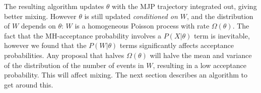 The resulting algorithm updates $\theta$ with the MJP trajectory 
integrated out, giving better mixing.
However $\theta$ is still updated {\em conditioned on
$W$}, and 
the distribution of $W$ depends on $\theta$: 
$W$ is a homogeneous
Poisson process with rate $\Omega(\theta)$. %
The fact that the MH-acceptance probability involves a $P(X|\theta)$ term
is inevitable, however we found that the $P(W|\theta)$
terms significantly affects acceptance probabilities. 
Any proposal that halves $\Omega(\theta)$ will halve the
mean and variance of the distribution of the number of events in $W$, 
resulting in a low acceptance probability.
This will affect mixing.
The next section describes an algorithm to get around this.
